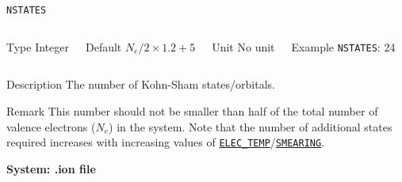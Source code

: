 \documentclass[xcolor=dvipsnames,t]{beamer}
\begin{document}
\begin{frame}[allowframebreaks]{\texttt{NSTATES}} \label{NSTATES}
\vspace*{-12pt}
\begin{columns}
\begin{block}{Type}
Integer
\end{block}

\begin{block}{Default}
$N_e/2 \times 1.2 + 5$
\end{block}

\begin{block}{Unit}
No unit
\end{block}

\begin{block}{Example}
\texttt{NSTATES}: 24
\end{block}
\end{columns}

\begin{block}{Description}
The number of Kohn-Sham states/orbitals.
\end{block}

\begin{block}{Remark}
This number should not be smaller than half of
the total number of valence electrons ($N_e$) in the system. Note that the number of additional states required increases with increasing values of \hyperlink{ELEC_TEMP}{\texttt{ELEC\_TEMP}}/\hyperlink{SMEARING}{\texttt{SMEARING}}.
\end{block}

\end{frame}

\begin{frame}[allowframebreaks,c]{} \label{System:ion}

\begin{center}
\Huge \textbf{System: .ion file}
\end{center}

\end{frame}
\end{document}
